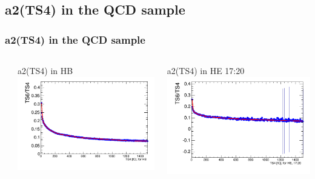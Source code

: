 \documentclass[bigger]{beamer}
\begin{document}
\subsection{a2(TS4) in the QCD sample}
\label{sec-3-6}
\begin{frame}
\frametitle{a2(TS4) in the QCD sample}
\label{sec-3-6-1}
\begin{columns} %
\label{sec-3-6-1-1}
\begin{column}{0.55\textwidth}
\label{sec-3-6-1-1-1}

\centering
a2(TS4) in HB
\includegraphics[width=\textwidth]{fig/a2_ring0.png}
\end{column}
\begin{column}{0.55\textwidth}
\label{sec-3-6-1-1-2}

\centering
a2(TS4) in HE 17:20
\includegraphics[width=\textwidth]{fig/a2_ring1.png}
\end{column}
\end{columns}
\end{frame}
\end{document}
